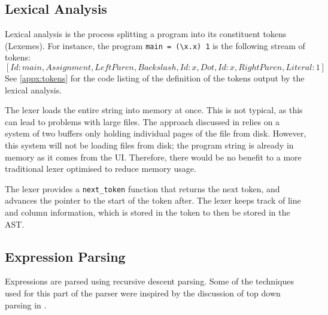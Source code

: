 \subsection{Lexical Analysis}
Lexical analysis is the process splitting a program into its constituent tokens (Lexemes). For instance, the program \verb|main = (\x.x) 1| is the following stream of tokens: \[[Id: main, Assignment, LeftParen, Backslash, Id: x, Dot, Id: x, RightParen, Literal: 1]\]
See \ref{appx:tokens} for the code listing of the definition of the tokens output by the lexical analysis.

The lexer loads the entire string into memory at once. This is not typical, as this can lead to problems with large files. The approach discussed in \cite{dragon_book} relies on a system of two buffers only holding individual pages of the file from disk. However, this system will not be loading files from disk; the program string is already in memory as it comes from the UI. Therefore, there would be no benefit to a more traditional lexer optimised to reduce memory usage. 

The lexer provides a \verb|next_token| function that returns the next token, and advances the pointer to the start of the token after. The lexer keeps track of line and column information, which is stored in the token to then be stored in the AST. 

\subsection{Expression Parsing}
Expressions are parsed using recursive descent parsing. Some of the techniques used for this part of the parser were inspired by the discussion of top down parsing in \cite{dragon_book}. 

